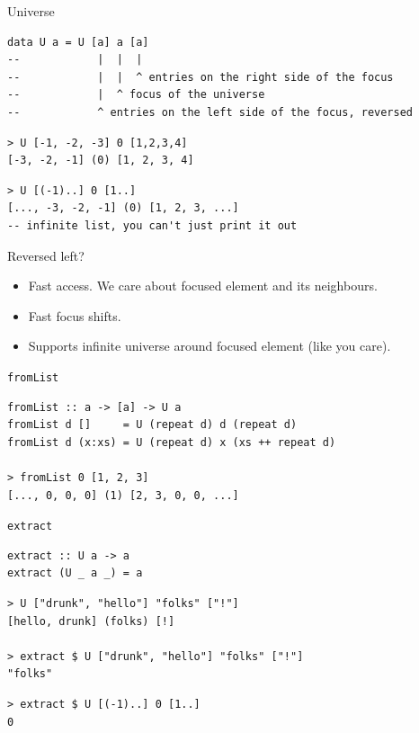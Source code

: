 \documentclass[presentation,aspectratio=169,smaller]{beamer}
\begin{document}
\begin{frame}[label={sec:orgfe2af4f},fragile]{Universe}
 \begin{verbatim}
data U a = U [a] a [a]
--            |  |  |
--            |  |  ^ entries on the right side of the focus
--            |  ^ focus of the universe
--            ^ entries on the left side of the focus, reversed
\end{verbatim}

\pause

\begin{verbatim}
> U [-1, -2, -3] 0 [1,2,3,4]
[-3, -2, -1] (0) [1, 2, 3, 4]
\end{verbatim}

\pause

\begin{verbatim}
> U [(-1)..] 0 [1..]
[..., -3, -2, -1] (0) [1, 2, 3, ...]
-- infinite list, you can't just print it out
\end{verbatim}
\end{frame}

\begin{frame}[label={sec:org6a5c54d}]{Reversed left?}
\begin{itemize}
\item Fast access. We care about focused element and its neighbours.
\item Fast focus shifts.
\item Supports infinite universe around focused element (like you care).
\end{itemize}
\end{frame}

\begin{frame}[label={sec:org46316da},fragile]{\texttt{fromList}}
 \begin{verbatim}
fromList :: a -> [a] -> U a
fromList d []     = U (repeat d) d (repeat d)
fromList d (x:xs) = U (repeat d) x (xs ++ repeat d)

> fromList 0 [1, 2, 3]
[..., 0, 0, 0] (1) [2, 3, 0, 0, ...]
\end{verbatim}
\end{frame}

\begin{frame}[label={sec:org926d1bd},fragile]{\texttt{extract}}
 \begin{verbatim}
extract :: U a -> a
extract (U _ a _) = a
\end{verbatim}

\pause

\begin{verbatim}
> U ["drunk", "hello"] "folks" ["!"]
[hello, drunk] (folks) [!]

> extract $ U ["drunk", "hello"] "folks" ["!"]
"folks"
\end{verbatim}

\pause

\begin{verbatim}
> extract $ U [(-1)..] 0 [1..]
0
\end{verbatim}
\end{frame}
\end{document}
